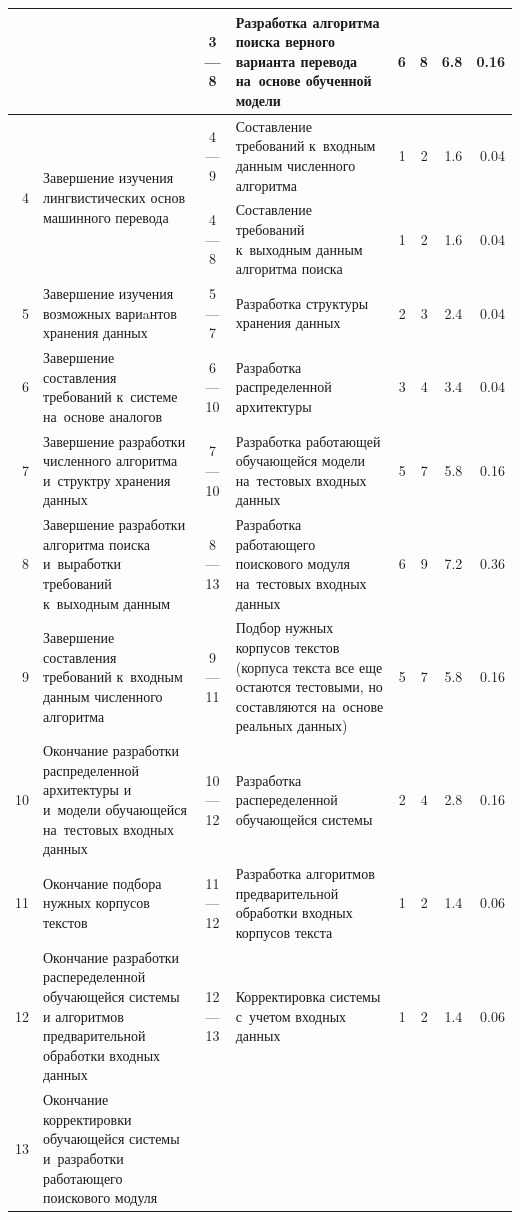 {\begin{spacing}{1.2}
\begin{center}
\begin{longtable}{|r|m{3.8cm}|c|m{4cm}|r|r|r|r|}
		\cline{3-8}	& &
			3 --- 8  &
			Разработка алгоритма поиска верного варианта перевода на~основе обученной модели &
			6 & 8 & 6.8 & 0.16 \\
		\hline
			\multirow{2}{*}{4}  &
			\multirow{2}{4cm}{Завершение изучения лингвистических основ машинного перевода} &
			4 --- 9  &
			Составление требований к~входным данным численного алгоритма &
			1 & 2 & 1.6	 &  0.04 \\
		\cline{3-8}	& &
			4 --- 8  &
			Составление требований к~выходным данным алгоритма поиска  &
			1 & 2 & 1.6	 &  0.04 \\
		\hline
			5 &
			Завершение изучения возможных вариaнтов хранения данных  &
			5 --- 7 &
			Разработка структуры хранения данных &
			2 & 3 & 2.4 & 0.04 \\
		\hline
			6 &
			Завершение составления требований к~системе на~основе аналогов  &
			6 --- 10  &
			Разработка распределенной архитектуры &
			3 & 4 & 3.4 & 0.04 \\
		\hline
			7 &
			Завершение разработки численного алгоритма и~структру хранения данных &
			7 --- 10  &
			Разработка работающей обучающейся модели на~тестовых входных данных &
			5 & 7 & 5.8 & 0.16 \\
		\hline
			8 &
			Завершение  разработки алгоритма поиска и~выработки требований к~выходным данным &
			8 --- 13 &
			Разработка работающего  поискового модуля на~тестовых входных данных &
			6 & 9 & 7.2 & 0.36 \\
		\hline
			9 &
			Завершение составления требований к~входным данным численного алгоритма &
			9 --- 11  &
			Подбор нужных корпусов текстов (корпуса текста все еще остаются тестовыми, 
			но составляются на~основе реальных данных) &
			5 & 7 & 5.8 & 0.16 \\
		\hline
			10 &
			Окончание разработки распределенной архитектуры и~ и~модели обучающейся на~тестовых входных данных&
			10 --- 12  &
			Разработка распеределенной обучающейся системы &
			2 & 4 & 2.8 & 0.16 \\
		\hline
			11 &
			Окончание подбора нужных корпусов текстов &
			11 --- 12  &
			Разработка алгоритмов предварительной обработки входных корпусов текста &
			1 & 2 & 1.4 & 0.06 \\
		\hline
			12 &
			Окончание разработки распеределенной обучающейся системы 
				и алгоритмов предварительной обработки входных данных&
			12 --- 13  &
			Корректировка  системы с~учетом входных данных &
			1 & 2 & 1.4 & 0.06 \\
		\hline
			13 &
			Окончание корректировки обучающейся системы  и~разработки работающего  поискового модуля &

\end{longtable}
\end{center}
\end{spacing}}
